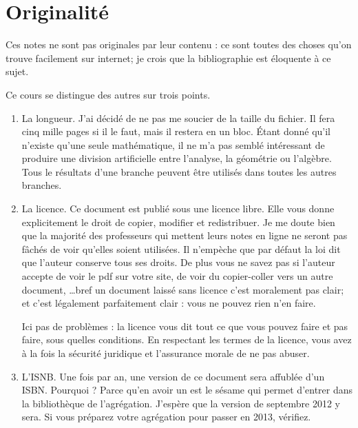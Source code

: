 \section*{Originalité}

Ces notes ne sont pas originales par leur contenu : ce sont toutes des choses qu'on trouve facilement sur internet; je crois que la bibliographie est éloquente à ce sujet.

Ce cours se distingue des autres sur trois points.
\begin{enumerate}
    \item
        La longueur. J'ai décidé de ne pas me soucier de la taille du fichier. Il fera cinq mille pages si il le faut, mais il restera en un bloc. Étant donné qu'il n'existe qu'une seule mathématique, il ne m'a pas semblé intéressant de produire une division artificielle entre l'analyse, la géométrie ou l'algèbre. Tous le résultats d'une branche peuvent être utilisés dans toutes les autres branches.

    \item
        La licence. Ce document est publié sous une licence libre. Elle vous donne explicitement le droit de copier, modifier et redistribuer. Je me doute bien que la majorité des professeurs qui mettent leurs notes en ligne ne seront pas fâchés de voir qu'elles soient utilisées. Il n'empèche que par défaut la loi dit que l'auteur conserve tous ses droits. De plus vous ne savez pas si l'auteur accepte de voir le pdf sur votre site, de voir du copier-coller vers un autre document, \ldots bref un document laissé sans licence c'est moralement pas clair; et c'est légalement parfaitement clair : vous ne pouvez rien n'en faire. 

        Ici pas de problèmes : la licence vous dit tout ce que vous pouvez faire et pas faire, sous quelles conditions. En respectant les termes de la licence, vous avez à la fois la sécurité juridique et l'assurance morale de ne pas abuser.
    \item
        L'ISNB. Une fois par an, une version de ce document sera affublée d'un ISBN. Pourquoi ? Parce qu'en avoir un est le sésame qui permet d'entrer dans la bibliothèque de l'agrégation. J'espère que la version de septembre 2012 y sera. Si vous préparez votre agrégation pour passer en 2013, vérifiez.       
\end{enumerate}

